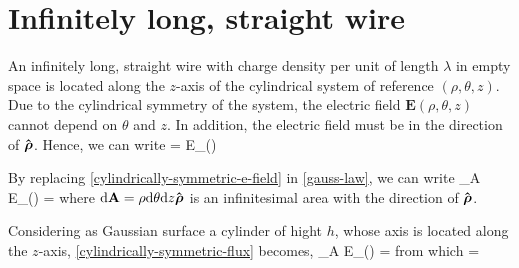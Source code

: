 \section{Infinitely long, straight wire}
An infinitely long, straight wire with charge density per unit of length $\lambda$ in empty space is located along the $z$-axis of the 
cylindrical system of reference $(\rho, \theta, z)$. Due to the cylindrical symmetry of the system, the electric field
$\mathbf{E}(\rho,\theta,z)$ cannot depend on $\theta$ and $z$. In addition, the electric field must be in the direction of $\boldsymbol{\hat{\textbf{$\mathrm\rho$}}}$. 
Hence, we can write
\be\label{cylindrically-symmetric-e-field}
 = E_{\rho}(\rho)\uvec{\rho}
\ee

By replacing \ref{cylindrically-symmetric-e-field} in \ref{gauss-law}, we can write
\be\label{cylindrically-symmetric-flux}
\oiint_A E_{\rho}(\rho) \cdot \uvec{\rho} \cdot {} =
\ee
where $\mathrm{d}\mathbf{A} =  \rho\mathrm{d}\theta \mathrm{d}z\boldsymbol{\hat{\textbf{$\mathrm\rho$}}}$ is an infinitesimal area with the direction of $\boldsymbol{\hat{\textbf{$\mathrm\rho$}}}$.

Considering as Gaussian surface a cylinder of hight $h$, whose axis is located along the $z$-axis, \ref{cylindrically-symmetric-flux} becomes,
\be\label{cylindrically-symmetric-flux-2}
\oiint_A E_{\rho}(\rho) \uvec{\rho}\cdot\uvec{\rho} \rho \total{\theta}=
\ee
from which
\be
{}=\uvec{\rho}
\ee

